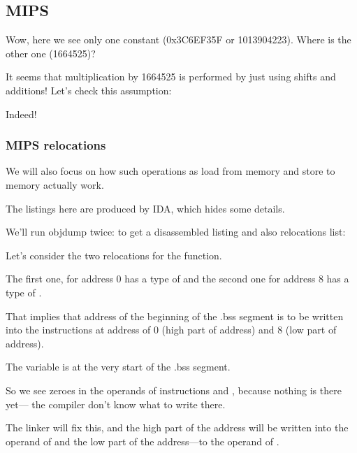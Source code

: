 \subsection{MIPS}



Wow, here we see only one constant (0x3C6EF35F or 1013904223).
Where is the other one (1664525)?

It seems that multiplication by 1664525 is performed by just using shifts and additions!
Let's check this assumption:





Indeed!

\subsubsection{MIPS relocations}

We will also focus on how such operations as load from memory and store to memory actually work.

The listings here are produced by IDA, which hides some details.

We'll run objdump twice: to get a disassembled listing and also relocations list:



Let's consider the two relocations for the  function.

The first one, for address 0 has a type of 
and the second one for address 8 has a type of .

That implies that address of the beginning of the .bss segment is to be written into the instructions at
address of 0 (high part of address) and 8 (low part of address).

The  variable is at the very start of the .bss segment.

So we see zeroes in the operands of instructions \LUI and \SW, because nothing is there yet---
the compiler don't know what to write there.

The linker will fix this, and the high part of the address will be written into the operand of \LUI and
the low part of the address---to the operand of \SW.

